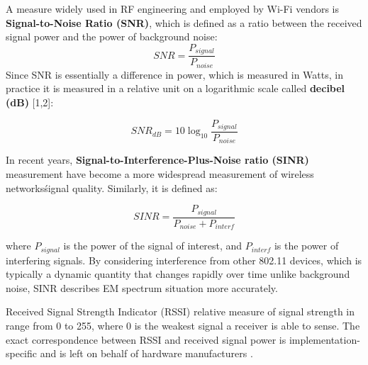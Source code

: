 A measure widely used in RF engineering and employed by Wi-Fi vendors is \textbf{Signal-to-Noise Ratio (SNR)}, which is defined as a ratio between the received signal power and the power of background noise:
\begin{equation}
    \label{formula:snr}
    SNR = \frac{P_{signal}}{P_{noise}}
\end{equation}
    Since SNR is essentially a difference in power, which is measured in Watts, in practice it is measured in a relative unit on a logarithmic scale called \textbf{decibel (dB)} [1,2]:

\begin{equation}
    \label{formula:snr_db}
    {SNR}_{dB} = 10\log_{10}\frac{P_{signal}}{P_{noise}}
\end{equation}

In recent years, \textbf{Signal-to-Interference-Plus-Noise ratio (SINR)} measurement have become a more widespread measurement of wireless networks\' signal quality. Similarly, it is defined as:

\begin{equation}
    \label{formula:sinr}
    SINR = \frac{P_{signal}}{P_{noise} + P_{interf}}
\end{equation}

    where $P_{signal}$ is the power of the signal of interest, and $P_{interf}$ is the power of interfering signals.
    By considering interference from other 802.11 devices, which is typically a dynamic quantity that changes rapidly over time unlike background noise, SINR describes EM spectrum situation more accurately.

Received Signal Strength Indicator (RSSI) relative measure of signal strength in range from 0 to 255, where 0 is the weakest signal a receiver is able to sense. The exact correspondence between RSSI and received signal power is implementation-specific and is left on behalf of hardware manufacturers \cite{colemanCWNACertifiedWireless2021}.

